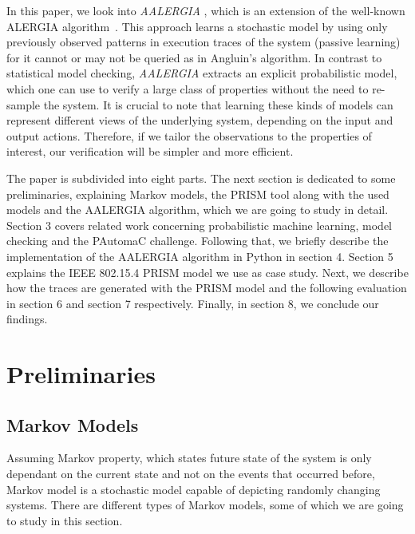\documentclass[
a4paper,
12pt
]{scrartcl}
\begin{document}
\par In this paper, we look into \emph{AALERGIA} \cite{Mao.}, which is an extension of the well-known ALERGIA algorithm~\cite{Carrasco.1994}. This approach learns a stochastic model by using only previously observed patterns in execution traces of the system (passive learning) for it cannot or may not be queried as in Angluin's algorithm. In contrast to statistical model checking, \emph{AALERGIA} extracts an explicit probabilistic model, which one can use to verify a large class of properties without the need to re-sample the system. It is crucial to note that learning these kinds of models can represent different views of the underlying system, depending on the input and output actions. Therefore, if we tailor the observations to the properties of interest, our verification will be simpler and more efficient.

\par The paper is subdivided into eight parts. The next section is dedicated to some preliminaries, explaining Markov models, the PRISM tool along with the used models and the AALERGIA algorithm, which we are going to study in detail. Section 3 covers related work concerning probabilistic machine learning, model checking and the PAutomaC challenge. Following that, we briefly describe the implementation of the AALERGIA algorithm in Python in section 4. Section 5 explains the IEEE 802.15.4 PRISM model we use as case study. Next, we describe how the traces are generated with the PRISM model and the following evaluation in section 6 and section 7 respectively. Finally, in section 8, we conclude our findings.

\newpage
\section{Preliminaries}
\subsection{Markov Models}
Assuming Markov property, which states future state of the system is only dependant on the current state and not on the events that occurred before, Markov model is a stochastic model capable of depicting randomly changing systems. There are different types of Markov models, some of which we are going to study in this section.
\end{document}
